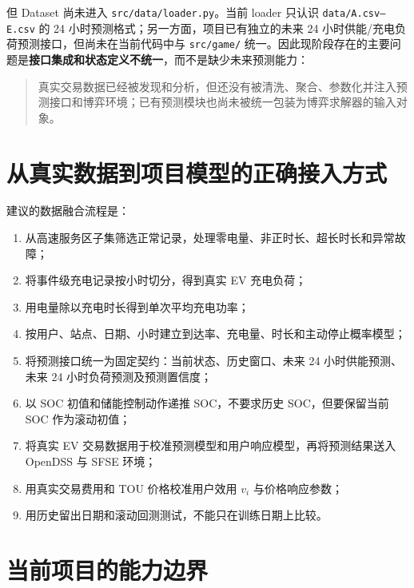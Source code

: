 \documentclass[UTF8,a4paper,11pt]{ctexart}
\begin{document}
但 Dataset 尚未进入 \texttt{src/data/loader.py}。当前 loader 只认识 \texttt{data/A.csv--E.csv} 的 24 小时预测格式；另一方面，项目已有独立的未来 24 小时供能/充电负荷预测接口，但尚未在当前代码中与 \texttt{src/game/} 统一。因此现阶段存在的主要问题是\textbf{接口集成和状态定义不统一}，而不是缺少未来预测能力：

\begin{quote}
真实交易数据已经被发现和分析，但还没有被清洗、聚合、参数化并注入预测接口和博弈环境；已有预测模块也尚未被统一包装为博弈求解器的输入对象。
\end{quote}

\section{从真实数据到项目模型的正确接入方式}

建议的数据融合流程是：

\begin{enumerate}
  \item 从高速服务区子集筛选正常记录，处理零电量、非正时长、超长时长和异常故障；
  \item 将事件级充电记录按小时切分，得到真实 EV 充电负荷；
  \item 用电量除以充电时长得到单次平均充电功率；
  \item 按用户、站点、日期、小时建立到达率、充电量、时长和主动停止概率模型；
  \item 将预测接口统一为固定契约：当前状态、历史窗口、未来 24 小时供能预测、未来 24 小时负荷预测及预测置信度；
  \item 以 SOC 初值和储能控制动作递推 SOC，不要求历史 SOC，但要保留当前 SOC 作为滚动初值；
  \item 将真实 EV 交易数据用于校准预测模型和用户响应模型，再将预测结果送入 OpenDSS 与 SFSE 环境；
  \item 用真实交易费用和 TOU 价格校准用户效用 $v_i$ 与价格响应参数；
  \item 用历史留出日期和滚动回测测试，不能只在训练日期上比较。
\end{enumerate}

\section{当前项目的能力边界}
\end{document}
